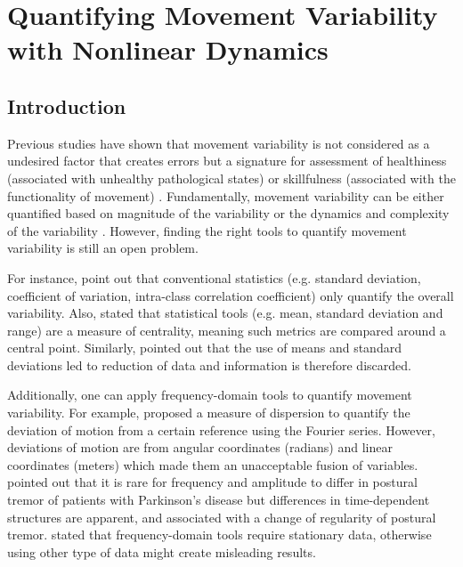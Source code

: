 \section{Quantifying Movement Variability with Nonlinear Dynamics}


\subsection{Introduction}
Previous studies have shown that movement variability is not considered 
as a undesired factor that creates errors but a signature for 
assessment of healthiness (associated with unhealthy pathological states) 
or skillfulness (associated with the functionality of movement) 
\citep{stergiou2011}. Fundamentally, movement variability can be either 
quantified based on magnitude of the variability or the dynamics and 
complexity of the variability \citep{caballero2014}. However, finding 
the right tools to quantify movement variability is still an open problem. 

For instance, \cite{preatoni2010, preatoni2013} point
out that conventional statistics (e.g. standard deviation, coefficient 
of variation, intra-class correlation coefficient) only quantify 
the overall variability.
Also, \cite{stergiou2011} stated that statistical tools 
(e.g. mean, standard deviation and range) are a measure of centrality,
meaning such metrics are compared around a central point. Similarly, 
\cite{coffey2011} pointed out that the use of means and standard deviations 
led to reduction of data and information is therefore discarded.



Additionally, one can apply frequency-domain tools to quantify movement 
variability.
For example, \cite{hatze1986} proposed a measure of dispersion to 
quantify the deviation of motion from a certain reference using the 
Fourier series. However, deviations of motion are from angular coordinates 
(radians) and linear coordinates (meters) which made them an unacceptable 
fusion of variables. 
\cite{vaillancourt2001} pointed out that it is rare for frequency and 
amplitude to differ in postural tremor of patients with Parkinson's disease
but differences in time-dependent structures are apparent, and associated with 
a change of regularity of postural tremor.
\cite{klonowski2002, klonowski2007, klonowski2009} stated that 
frequency-domain tools require stationary data, otherwise using 
other type of data might create misleading results.

